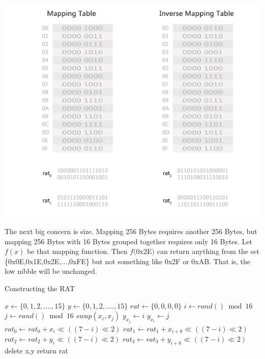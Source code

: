 \begin{center}
\includegraphics[scale=0.4,natwidth=640,natheight=530]{psd/after.png}
\end{center}

The next big concern is size. Mapping 256 Bytes requires another 256 Bytes, but mapping 256 Bytes with 16 Bytes grouped together requires only 16 Bytes. Let $f(x)$ be that mapping function. Then $f($0x2E$)$ can return anything from the set \{0x0E,0x1E,0x2E,...,0xFE\} but not something like 0x2F or 0xAB. That is, the low nibble will be unchanged.\\

\begin{algorithm}
	\caption{Constructing the RAT}
	\label{Constructing the RAT}

	\begin{algorithmic}[1]
	
	\State $x\gets \{0,1,2,....,15\}$
	\State $y\gets \{0,1,2,....,15\}$
	\State $rat\gets\{0,0,0,0\}$
		\State $i\gets rand() \bmod 16$
		\State $j\gets rand() \bmod 16$
		\State $swap(x_i,x_j)$
		\State $y_{x_j}\gets i$
		\State $y_{x_i}\gets j$
	\EndFor
		\State $rat_0 \gets rat_0 + x_i\ll((7-i)\ll2)$
		\State $rat_1 \gets rat_1 + x_{i+8}\ll((7-i)\ll2)$
		\State $rat_2 \gets rat_2 + y_i\ll((7-i)\ll2)$
		\State $rat_3 \gets rat_3 + y_{i+8}\ll((7-i)\ll2)$
	\EndFor
	\State delete x,y
	\State return rat
	
	\EndFunction	
	\end{algorithmic}
\end{algorithm}
\clearpage

